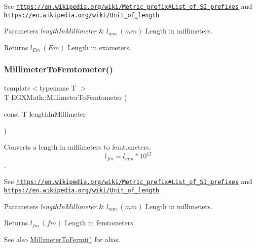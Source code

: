 See \href{https://en.wikipedia.org/wiki/Metric_prefix#List_of_SI_prefixes}{\tt https\+://en.\+wikipedia.\+org/wiki/\+Metric\+\_\+prefix\#\+List\+\_\+of\+\_\+\+S\+I\+\_\+prefixes} and \href{https://en.wikipedia.org/wiki/Unit_of_length}{\tt https\+://en.\+wikipedia.\+org/wiki/\+Unit\+\_\+of\+\_\+length} 
\begin{DoxyParams}{Parameters}
{\em length\+In\+Millimeter} & $ l_{mm}\ (mm)$ Length in millimeters. \\
\hline
\end{DoxyParams}
\begin{DoxyReturn}{Returns}
$ l_{Em}\ (Em)$ Length in exameters. 
\end{DoxyReturn}
\mbox{\label{group___e_g_x_math-_conversions-_length_conversions-_millimeter-_s_i_gaa6dd55424b685e10484ca46e394b2e92}} 
\subsubsection{\texorpdfstring{Millimeter\+To\+Femtometer()}{MillimeterToFemtometer()}}
{\footnotesize\ttfamily template$<$typename T $>$ \\
T E\+G\+X\+Math\+::\+Millimeter\+To\+Femtometer (\begin{DoxyParamCaption}\item[{const T}]{length\+In\+Millimeter }\end{DoxyParamCaption})}



Converts a length in millimeters to femtometers. \[ l_{fm}=l_{mm} * 10^{12} \]. 

See \href{https://en.wikipedia.org/wiki/Metric_prefix#List_of_SI_prefixes}{\tt https\+://en.\+wikipedia.\+org/wiki/\+Metric\+\_\+prefix\#\+List\+\_\+of\+\_\+\+S\+I\+\_\+prefixes} and \href{https://en.wikipedia.org/wiki/Unit_of_length}{\tt https\+://en.\+wikipedia.\+org/wiki/\+Unit\+\_\+of\+\_\+length} 
\begin{DoxyParams}{Parameters}
{\em length\+In\+Millimeter} & $ l_{mm}\ (mm)$ Length in millimeters. \\
\hline
\end{DoxyParams}
\begin{DoxyReturn}{Returns}
$ l_{fm}\ (fm)$ Length in femtometers. 
\end{DoxyReturn}
\begin{DoxySeeAlso}{See also}
\mbox{\hyperlink{group___e_g_x_math-_conversions-_length_conversions-_millimeter-_non-_s_i_gaeb57dff8b2e092b5a655ffdd9960897d}{Millimeter\+To\+Fermi()}} for alias. 
\end{DoxySeeAlso}
\mbox{\label{group___e_g_x_math-_conversions-_length_conversions-_millimeter-_s_i_gaeadd93f73f66f5b904919def3d44e858}} 
